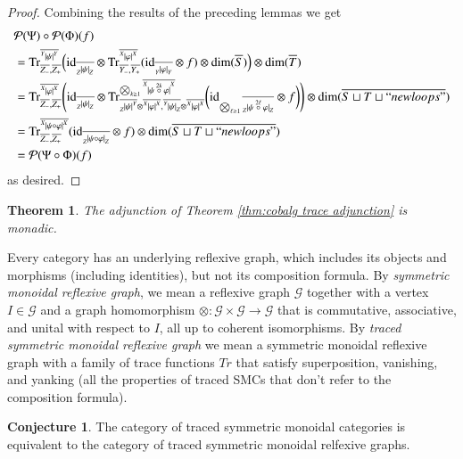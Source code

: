\documentclass{amsart}
\def\tn{\textnormal}
\def\mc{\mathcal}
\def\dim{\tn{dim}}
\def\Trace{\tn{Tr}}
\def\to{\rightarrow}
\def\taking{\colon}
\def\ol{\overline}
\def\id{\tn{id}}
\def\mcG{\mc{G}}
\def\mcP{\mc{P}}
\newcommand{\inp}[1]{{#1_-}}
\newcommand{\outp}[1]{{#1_+}}
\newcommand{\feeddd}[3]{{\tensor*[^{#2}_{\color{white}{!}}]{{|#1|}}{^{#3}}}}%
\newcommand{\feeddc}[3]{{\tensor*[^{#2}]{{|#1|}}{_{#3}}}}
\newcommand{\feedcd}[3]{{\tensor*[_{#2}]{{|#1|}}{^{#3}}}}
\newcommand{\feedcc}[3]{{\tensor*[^{\color{white}{!}}_{#2}]{{|#1|}}{_{#3}}}}
\newtheorem{theorem}[subsubsection]{Theorem}
\theoremstyle{remark}
\theoremstyle{definition}
\newtheorem{conjecture}[subsubsection]{Conjecture}
\begin{document}
\begin{proof}
Combining the results of the preceding lemmas we get
\begin{align*}
&\mcP(\Psi)\circ\mcP(\Phi)(f)\\
&=
\Trace^{\ol{\feeddd{\psi}{Y}{Y}}}_{\ol{Z_-},\ol{Z_+}}
\Big(
\id_{\ol{\feedcc{\psi}{Z}{Z}}}\otimes
\Trace^{\ol{\feeddd{\varphi}{X}{X}}}_{\ol{Y_-},\ol{Y_+}}(\id_{\ol{\feedcc{\varphi}{Y}{Y}}}\otimes f)\otimes\dim(\ol{S})
\Big)
\otimes\dim(\ol{T})\\
&=\Trace^{\ol{\feeddd{\varphi}{X}{X}}}_{\ol{\inp{Z}},\ol{\outp{Z}}}
\Bigg(
\id_{\ol{\feedcc{\psi}{Z}{Z}}}\otimes\Trace^{\bigotimes_{k\ge1}\ol{\feeddd{\psi\;\accentset{2k}{\circ}\;\varphi}{X}{X}}
}_{\ol{\feedcd{\psi}{Z}{Y}}\otimes\ol{\feeddd{\varphi}{X}{X}},\ol{\feeddc{\psi}{Y}{Z}}\otimes\ol{\feeddd{\varphi}{X}{X}}}
\bigg(
\id_{\bigotimes_{\ell\ge1}\ol{\feedcc{\psi\;\accentset{2\ell}{\circ}\;\varphi}{Z}{Z}}
}\otimes f
\bigg)
\Bigg)\otimes\dim(\ol{S\sqcup T\sqcup ``newloops"})\\
&=\Trace^{\ol{\feeddd{\psi\circ\varphi}{X}{X}}}_{\ol{Z_-},\ol{Z_+}}(\id_{\ol{\feedcc{\psi\circ\varphi}{Z}{Z}}}\otimes f)\otimes\dim(\ol{S\sqcup T\sqcup ``newloops"})\\
&=\mcP(\Psi\circ\Phi)(f)
\end{align*}
as desired.
\end{proof}

\begin{theorem}

The adjunction of Theorem \ref{thm:cobalg trace adjunction} is monadic. 

\end{theorem}

Every category has an underlying reflexive graph, which includes its objects and morphisms (including identities), but not its composition formula. By {\em symmetric monoidal reflexive graph}, we mean a reflexive graph $\mcG$ together with a vertex $I\in \mcG$ and a graph homomorphism $\otimes\taking\mcG\times\mcG\to\mcG$ that is commutative, associative, and unital with respect to $I$, all up to coherent isomorphisms. By {\em traced symmetric monoidal reflexive graph} we mean a symmetric monoidal reflexive graph with a family of trace functions $Tr$ that satisfy superposition, vanishing, and yanking (all the properties of traced SMCs that don't refer to the composition formula).

\begin{conjecture}
The category of traced symmetric monoidal categories is equivalent to the category of traced symmetric monoidal relfexive graphs.
\end{conjecture}
\end{document}

